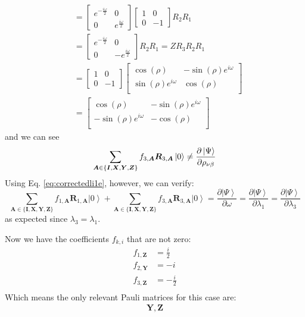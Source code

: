 \documentclass{aux/ttuthes2007}
\newcommand{\ket}[1]{\ensuremath{\left|#1\right\rangle}}
\newcommand{\s}[1]{\sin\left( #1 \right)}
\newcommand{\co}[1]{\cos\left( #1 \right)}
\newcommand{\fpd}[2]{\frac{\partial #1}{\partial #2}}
\newcommand{\ind}[1]{{\uo #1 \oo #1}}
\newcommand{\uo}[1]{
		\IfEqCase{#1}{
			{0}{\mu}
			{1}{\nu}
			{2}{\xi}
		}[\PackageError{uo}{Undefined option to uo: #1}{}]
}
\newcommand{\oo}[1]{
		\IfEqCase{#1}{
			{0}{\alpha}
			{1}{\beta}
			{2}{\gamma}
		}[\PackageError{unocorb}{Undefined option to unuo: #1}{}]
}
\newcommand{\Z}{\begin{bmatrix}	1 & 0 \\ 0 & -1 \end{bmatrix} }
\begin{document}
\begin{enumerate}
\begin{align*}
	&=\begin{bmatrix}
		e^{-\frac {i\omega} 2} & 0 \\
		0 & e^{\frac {i\omega} 2}
	\end{bmatrix} 
	\Z R_2 R_1
	\\
	&=\begin{bmatrix}
		e^{-\frac {i\omega} 2} & 0 \\
		0 & -e^{\frac {i\omega} 2}
	\end{bmatrix} 
	R_2 R_1
	= Z R_3 R_2 R_1
	\\
	&= \begin{bmatrix}1 & 0 \\ 0 & -1\end{bmatrix}
	\begin{bmatrix}
		\co \rho & - \s \rho e^{i\omega} \\
		\s \rho e^{i\omega} & \co \rho\\
	\end{bmatrix} 
	\\
	&= \begin{bmatrix}
		\co \rho &  -\s \rho e^{i\omega} \\
		-\s \rho e^{i\omega} & -\co \rho\\
	\end{bmatrix} 
\end{align*}
%
and we can see
%
$$
	\sum_{\bm A \in \{\bm I, \bm X, \bm Y, \bm Z\}} f_{3, \bm A} \bm R_{3, \bm A} \ket 0 
	\neq \fpd{\ket\Psi}{\rho_\ind 1}
$$
%
Using Eq. \ref{eq:correctedli1e}, however, we can verify:
%
$$
	\sum_{\bm A \in \{\bm I, \bm X, \bm Y, \bm Z\}} f_{1, \bm A} \bm R_{1, \bm A} \ket 0 
	+ \sum_{\bm A \in \{\bm I, \bm X, \bm Y, \bm Z\}} f_{3, \bm A} \bm R_{3, \bm A} \ket 0 
	= \fpd{\ket\Psi}{\omega}
	= \fpd{\ket\Psi}{\lambda_1}
	= \fpd{\ket\Psi}{\lambda_3}
$$
%
as expected since $\lambda_3 = \lambda_1$.
%
\end{enumerate}
%
Now we have the coefficients $f_{k, i}$ that are not zero:
%
\begin{equation*}
	\begin{split}
		f_{1, \bm {Z}} &= \frac i 2 \\
		f_{2, \bm {Y}} &= -i \\
		f_{3, \bm {Z}} &= -\frac i 2 \\
	\end{split}
\end{equation*}
%
Which means the only relevant Pauli matrices for this case are:
%
\begin{align*}
	\bm Y, \bm Z
\end{align*}
\end{document}
